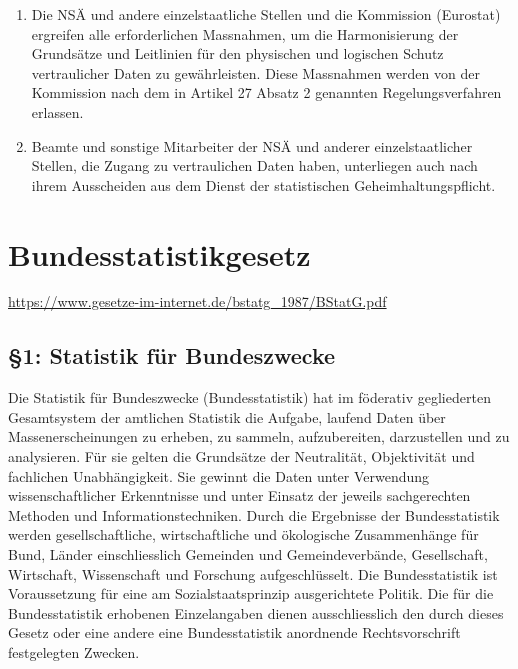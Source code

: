 \documentclass[A4, 12pt]{scrbook}
\begin{document}
\begin{enumerate}[label=(\arabic*)]
            \item Die NSÄ und andere einzelstaatliche Stellen und die Kommission (Eurostat) ergreifen alle erforderlichen Massnahmen, um die Harmonisierung der Grundsätze und Leitlinien für den physischen und logischen Schutz vertraulicher Daten zu gewährleisten. Diese Massnahmen werden von der Kommission nach dem in Artikel 27 Absatz 2 genannten Regelungsverfahren erlassen.
            \item Beamte und sonstige Mitarbeiter der NSÄ und anderer einzelstaatlicher Stellen, die Zugang zu vertraulichen Daten haben, unterliegen auch nach ihrem Ausscheiden aus dem Dienst der statistischen Geheimhaltungspflicht.
        \end{enumerate}
\chapter[BStatG]{Bundesstatistikgesetz}
\newline
\url{https://www.gesetze-im-internet.de/bstatg_1987/BStatG.pdf}
    \section{\S 1: Statistik für Bundeszwecke} 
    Die Statistik für Bundeszwecke (Bundesstatistik) hat im föderativ gegliederten Gesamtsystem der amtlichen Statistik die Aufgabe, laufend Daten über Massenerscheinungen zu erheben, zu sammeln, aufzubereiten, darzustellen und zu analysieren. Für sie gelten die Grundsätze der Neutralität, Objektivität und fachlichen Unabhängigkeit. Sie gewinnt die Daten unter Verwendung wissenschaftlicher Erkenntnisse und unter Einsatz der jeweils sachgerechten Methoden und Informationstechniken. Durch die Ergebnisse der Bundesstatistik werden gesellschaftliche, wirtschaftliche und ökologische Zusammenhänge für Bund, Länder einschliesslich Gemeinden und Gemeindeverbände, Gesellschaft, Wirtschaft, Wissenschaft und Forschung aufgeschlüsselt. Die Bundesstatistik ist Voraussetzung für eine am Sozialstaatsprinzip ausgerichtete Politik. Die für die Bundesstatistik erhobenen Einzelangaben dienen ausschliesslich den durch dieses Gesetz oder eine andere eine Bundesstatistik anordnende Rechtsvorschrift festgelegten Zwecken.
\end{document}

